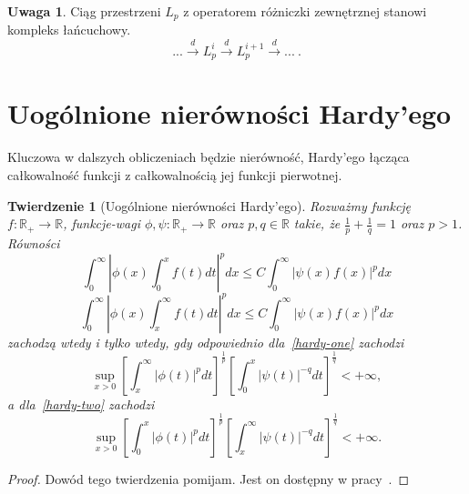 \documentclass[licencjacka]{pracamgr}
\theoremstyle{definition}
\theoremstyle{definition}
\newtheorem{remark}{Uwaga}[section]
\theoremstyle{plain}
\theoremstyle{plain}
\theoremstyle{plain}
\newtheorem{theorem}{Twierdzenie}[section]
\theoremstyle{plain}
\begin{document}
\begin{remark}
Ciąg przestrzeni $L_p$ z operatorem różniczki zewnętrznej stanowi
kompleks łańcuchowy.
\[
   ... \xrightarrow{d} 
L_p^i 
   \xrightarrow{d} 
L_p^{i+1}
   \xrightarrow{d} 
...~.
\]
\end{remark}


\section{Uogólnione nierówności Hardy'ego}
Kluczowa w dalszych obliczeniach będzie nierówność, Hardy'ego łącząca całkowalność
funkcji z całkowalnością jej funkcji pierwotnej.

\begin{theorem}[Uogólnione nierówności Hardy'ego]\label{hardy}
    Rozważmy funkcję $f: \mathbb{R}_{+} \rightarrow \mathbb{R}$, funkcje-wagi
    $\phi, \psi: \mathbb{R}_{+} \rightarrow \mathbb{R}$ oraz $p, q \in
    \mathbb{R}$ takie, że $\frac{1}{p} + \frac{1}{q} = 1 $ oraz $p > 1$.  Równości 
\begin{equation}\label{hardy-one}
\int_0^\infty \left|
                \phi(x) \int_0^x f(t) dt
              \right|^p dx
\leq
C \int_0^\infty \left|
                    \psi(x)  f(x)
                \right|^p dx
\end{equation}
\begin{equation}\label{hardy-two}
\int_0^\infty \left|
                \phi(x) \int_x^\infty f(t) dt
              \right|^p dx
\leq
C \int_0^\infty \left|
                    \psi(x)  f(x)
                \right|^p dx
\end{equation}
zachodzą wtedy i tylko wtedy, gdy odpowiednio dla~\ref{hardy-one} zachodzi
\[
\sup_{x > 0}
\left[
\int_x^\infty  
   | \phi(t) |^p dt
\right]^{\frac{1}{p}}
\left[
\int_0^x
    | \psi(t) |^{-q} dt
\right]^{\frac{1}{q}} < + \infty,
\]
a dla~\ref{hardy-two} zachodzi
\[
\sup_{x > 0}
\left[
\int_0^x
   | \phi(t) |^p dt
\right]^{\frac{1}{p}}
\left[
\int_x^\infty
    | \psi(t) |^{-q} dt
\right]^{\frac{1}{q}} < + \infty.
\]

\end{theorem}
\begin{proof}
Dowód tego twierdzenia pomijam. Jest on dostępny w pracy~\cite{hardys}.
\end{proof}
\end{document}
